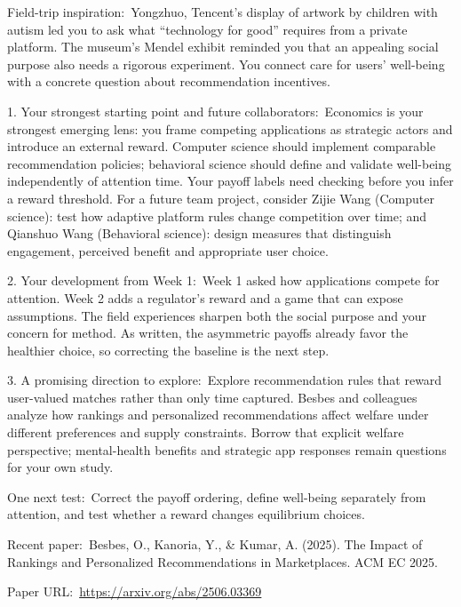 \begin{enumerate}
Field-trip inspiration:~Yongzhuo, Tencent’s display of artwork by children with autism led you to ask what “technology for good” requires from a private platform. The museum’s Mendel exhibit reminded you that an appealing social purpose also needs a rigorous experiment. You connect care for users’ well-being with a concrete question about recommendation incentives.

1. Your strongest starting point and future collaborators:~Economics is your strongest emerging lens: you frame competing applications as strategic actors and introduce an external reward. Computer science should implement comparable recommendation policies; behavioral science should define and validate well-being independently of attention time. Your payoff labels need checking before you infer a reward threshold. For a future team project, consider Zijie Wang (Computer science): test how adaptive platform rules change competition over time; and Qianshuo Wang (Behavioral science): design measures that distinguish engagement, perceived benefit and appropriate user choice.

2. Your development from Week 1:~Week 1 asked how applications compete for attention. Week 2 adds a regulator’s reward and a game that can expose assumptions. The field experiences sharpen both the social purpose and your concern for method. As written, the asymmetric payoffs already favor the healthier choice, so correcting the baseline is the next step.

3. A promising direction to explore:~Explore recommendation rules that reward user-valued matches rather than only time captured. Besbes and colleagues analyze how rankings and personalized recommendations affect welfare under different preferences and supply constraints. Borrow that explicit welfare perspective; mental-health benefits and strategic app responses remain questions for your own study.

One next test:~Correct the payoff ordering, define well-being separately from attention, and test whether a reward changes equilibrium choices.

Recent paper:~Besbes, O., Kanoria, Y., \& Kumar, A. (2025). The Impact of Rankings and Personalized Recommendations in Marketplaces. ACM EC 2025.

Paper URL:~{\def\UrlBreaks{\do a\do b\do c\do d\do e\do f\do g\do h\do i\do j\do k\do l\do m\do n\do o\do p\do q\do r\do s\do t\do u\do v\do w\do x\do y\do z\do A\do B\do C\do D\do E\do F\do G\do H\do I\do J\do K\do L\do M\do N\do O\do P\do Q\do R\do S\do T\do U\do V\do W\do X\do Y\do Z\do 0\do 1\do 2\do 3\do 4\do 5\do 6\do 7\do 8\do 9\do /\do -\do _\do .\do ?\do =\do &}\url{https://arxiv.org/abs/2506.03369}}


\end{enumerate}
